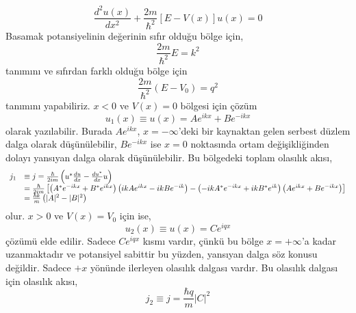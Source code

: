 \documentclass[a4paper,12pt, twoside]{article}
\begin{document}
\begin{equation}
\frac { d ^ { 2 } u ( x ) } { d x ^ { 2 } } + \frac { 2 m } { \hbar ^ { 2 } } [ E - V ( x ) ] u ( x ) = 0
\end{equation}
Basamak potansiyelinin değerinin sıfır olduğu bölge için,
\begin{equation}
\frac { 2 m} { \hbar ^ { 2 } } E = k ^ { 2 }
\end{equation}
tanımını ve sıfırdan farklı olduğu bölge için
\begin{equation}
\frac { 2 m} { \hbar ^ { 2 } }  \left( E - V _ { 0 } \right) = q ^ { 2 }
\end{equation}
tanımını yapabiliriz. $x<0$ ve $V(x)=0$ bölgesi için çözüm
\begin{equation}
u_1 ( x ) \equiv u ( x ) = A e ^ { i k x } + B e ^ { - i k x }
\end{equation}
olarak yazılabilir. Burada $A e ^ { i k x }$, $x=-\infty$'deki bir kaynaktan gelen serbest düzlem dalga olarak düşünülebilir, $B e ^ { -i k x }$ ise $x=0$ noktasında ortam değişikliğinden dolayı yansıyan dalga olarak düşünülebilir. Bu bölgedeki toplam olasılık akısı,
\begin{equation}
\begin{array} { r l } 
{ j_1 } &\equiv  j  = \frac { \hbar } { 2 i m } \left( u ^ { * } \frac { d u } { d x } - \frac { d u ^ { * } } { d x } u \right) \\
& = \frac { \hbar } { 2 i m } \left[ \left(A^{*} e ^ { - i k x } + B ^ { * } e ^ { i k x } \right) \left(i k A e ^ { i k x } - i k B e ^ { - i k } \right) - \left( -i k A^{*} e ^ { -i k x } + i k B^* e ^ {  i k } \right) \left( A e ^ { i k x } + B  e ^ { -i k x } \right)  \right]  \\ 
{ } & { = \frac { \hbar k } { m } \left( | A | ^ { 2 }  - | B | ^ { 2 } \right) } \end{array}
\end{equation}
olur. $x>0$ ve $V(x)=V_0$ için ise,
\begin{equation}
u_2 ( x ) \equiv u ( x ) =  C e ^ { i q x }
\end{equation}
çözümü elde edilir. Sadece $C e ^ { i q x }$ kısmı vardır, çünkü bu bölge $x=+\infty$'a kadar uzanmaktadır ve potansiyel sabittir bu yüzden, yansıyan dalga söz konusu değildir. Sadece $+x$ yönünde ilerleyen olasılık dalgası vardır. Bu olasılık dalgası için olasılık akısı,
\begin{equation}
j_2 \equiv j = \frac { \hbar q } { m } | C | ^ { 2 }
\end{equation}
\end{document}
